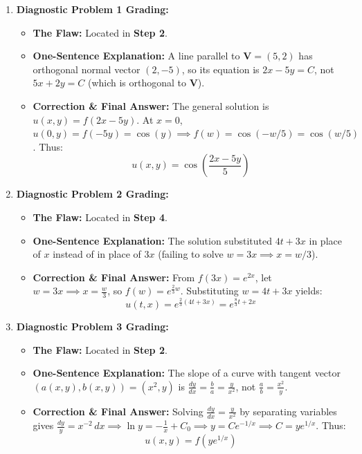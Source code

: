\documentclass[11pt]{article}
\begin{document}
\begin{enumerate}
    \item \textbf{Diagnostic Problem 1 Grading:}
    \begin{itemize}
        \item \textbf{The Flaw:} Located in \textbf{Step 2}.
        \item \textbf{One-Sentence Explanation:} A line parallel to $\mathbf{V} = (5, 2)$ has orthogonal normal vector $(2, -5)$, so its equation is $2x - 5y = C$, not $5x + 2y = C$ (which is orthogonal to $\mathbf{V}$).
        \item \textbf{Correction \& Final Answer:} The general solution is $u(x, y) = f(2x - 5y)$. At $x = 0$, $u(0, y) = f(-5y) = \cos(y) \implies f(w) = \cos(-w/5) = \cos(w/5)$. Thus:
        \[
        \boxed{u(x, y) = \cos\left(\frac{2x - 5y}{5}\right)}
        \]
    \end{itemize}

    \item \textbf{Diagnostic Problem 2 Grading:}
    \begin{itemize}
        \item \textbf{The Flaw:} Located in \textbf{Step 4}.
        \item \textbf{One-Sentence Explanation:} The solution substituted $4t + 3x$ in place of $x$ instead of in place of $3x$ (failing to solve $w = 3x \implies x = w/3$).
        \item \textbf{Correction \& Final Answer:} From $f(3x) = e^{2x}$, let $w = 3x \implies x = \frac{w}{3}$, so $f(w) = e^{\frac{2}{3}w}$. Substituting $w = 4t + 3x$ yields:
        \[
        \boxed{u(t, x) = e^{\frac{2}{3}(4t + 3x)} = e^{\frac{8}{3}t + 2x}}
        \]
    \end{itemize}

    \item \textbf{Diagnostic Problem 3 Grading:}
    \begin{itemize}
        \item \textbf{The Flaw:} Located in \textbf{Step 2}.
        \item \textbf{One-Sentence Explanation:} The slope of a curve with tangent vector $(a(x,y), b(x,y)) = (x^2, y)$ is $\frac{dy}{dx} = \frac{b}{a} = \frac{y}{x^2}$, not $\frac{a}{b} = \frac{x^2}{y}$.
        \item \textbf{Correction \& Final Answer:} Solving $\frac{dy}{dx} = \frac{y}{x^2}$ by separating variables gives $\frac{dy}{y} = x^{-2}\,dx \implies \ln y = -\frac{1}{x} + C_0 \implies y = Ce^{-1/x} \implies C = ye^{1/x}$. Thus:
        \[
        \boxed{u(x, y) = f\left(ye^{1/x}\right)}
        \]
    \end{itemize}


\end{enumerate}
\end{document}
